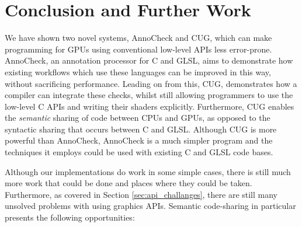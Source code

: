 \documentclass[a4paper,12pt,twoside,openright]{report}
\begin{document}

\chapter{Conclusion and Further Work}

\label{chp:conclusion_and_further_work}



We have shown two novel systems, AnnoCheck and CUG, which can make programming
for GPUs using conventional low-level APIs less error-prone. AnnoCheck, an
annotation processor for C and GLSL, aims to demonstrate how existing workflows
which use these languages can be improved in this way, without sacrificing
performance. Leading on from this, CUG, demonstrates how a compiler can
integrate these checks, whilst still allowing programmers to use the low-level
C APIs and writing their shaders explicitly. Furthermore, CUG enables the
\textit{semantic} sharing of code between CPUs and GPUs, as opposed to the
syntactic sharing that occurs between C and GLSL. Although CUG is more powerful
than AnnoCheck, AnnoCheck is a much simpler program and the techniques it
employs could be used with existing C and GLSL code bases.

Although our implementations do work in some simple cases, there is still much
more work that could be done and places where they could be taken. Furthermore,
as covered in Section \ref{sec:api_challanges}, there are still many unsolved
problems with using graphics APIs. Semantic code-sharing in particular presents
the following opportunities:
\end{document}
